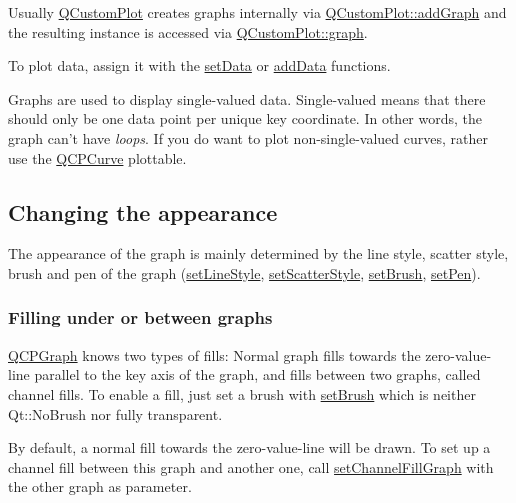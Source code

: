 Usually \hyperlink{class_q_custom_plot}{Q\-Custom\-Plot} creates graphs internally via \hyperlink{class_q_custom_plot_a6fb2873d35a8a8089842d81a70a54167}{Q\-Custom\-Plot\-::add\-Graph} and the resulting instance is accessed via \hyperlink{class_q_custom_plot_a6d3ed93c2bf46ab7fa670d66be4cddaf}{Q\-Custom\-Plot\-::graph}.

To plot data, assign it with the \hyperlink{class_q_c_p_graph_a1df2fd710545c8ba3b2c99a39a27bf8b}{set\-Data} or \hyperlink{class_q_c_p_graph_aa5c6181d84db72ce4dbe9dc15a34ef4f}{add\-Data} functions.

Graphs are used to display single-\/valued data. Single-\/valued means that there should only be one data point per unique key coordinate. In other words, the graph can't have {\itshape loops}. If you do want to plot non-\/single-\/valued curves, rather use the \hyperlink{class_q_c_p_curve}{Q\-C\-P\-Curve} plottable.\hypertarget{class_q_c_p_statistical_box_appearance}{}\subsection{Changing the appearance}\label{class_q_c_p_statistical_box_appearance}
The appearance of the graph is mainly determined by the line style, scatter style, brush and pen of the graph (\hyperlink{class_q_c_p_graph_a513fecccff5b2a50ce53f665338c60ff}{set\-Line\-Style}, \hyperlink{class_q_c_p_graph_a12bd17a8ba21983163ec5d8f42a9fea5}{set\-Scatter\-Style}, \hyperlink{class_q_c_p_abstract_plottable_a7a4b92144dca6453a1f0f210e27edc74}{set\-Brush}, \hyperlink{class_q_c_p_abstract_plottable_ab74b09ae4c0e7e13142fe4b5bf46cac7}{set\-Pen}).\hypertarget{class_q_c_p_graph_filling}{}\subsubsection{Filling under or between graphs}\label{class_q_c_p_graph_filling}
\hyperlink{class_q_c_p_graph}{Q\-C\-P\-Graph} knows two types of fills\-: Normal graph fills towards the zero-\/value-\/line parallel to the key axis of the graph, and fills between two graphs, called channel fills. To enable a fill, just set a brush with \hyperlink{class_q_c_p_abstract_plottable_a7a4b92144dca6453a1f0f210e27edc74}{set\-Brush} which is neither Qt\-::\-No\-Brush nor fully transparent.

By default, a normal fill towards the zero-\/value-\/line will be drawn. To set up a channel fill between this graph and another one, call \hyperlink{class_q_c_p_graph_a2d03156df1b64037a2e36cfa50351ca3}{set\-Channel\-Fill\-Graph} with the other graph as parameter.

